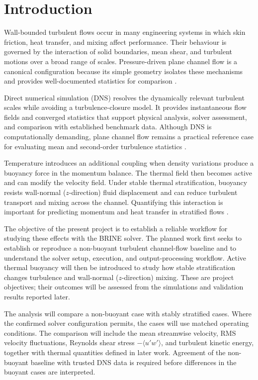 \chapter{Introduction}
\label{sec:introduction}

Wall-bounded turbulent flows occur in many engineering systems in which skin
friction, heat transfer, and mixing affect performance. Their behaviour is
governed by the interaction of solid boundaries, mean shear, and turbulent
motions over a broad range of scales. Pressure-driven plane channel flow is a
canonical configuration because its simple geometry isolates these mechanisms
and provides well-documented statistics for comparison
\cite{pope2000,kimMoinMoser1987}.

Direct numerical simulation (DNS) resolves the dynamically relevant turbulent
scales while avoiding a turbulence-closure model. It provides instantaneous
flow fields and converged statistics that support physical analysis, solver
assessment, and comparison with established benchmark data. Although DNS is
computationally demanding, plane channel flow remains a practical reference
case for evaluating mean and second-order turbulence statistics
\cite{kimMoinMoser1987}.

Temperature introduces an additional coupling when density variations produce
a buoyancy force in the momentum balance. The thermal field then becomes
active and can modify the velocity field. Under stable thermal stratification,
buoyancy resists wall-normal ($z$-direction) fluid displacement and can reduce
turbulent transport and mixing across the channel. Quantifying this interaction
is important for predicting momentum and heat transfer in stratified flows
\cite{armenioSarkar2002}.

The objective of the present project is to establish a reliable workflow for
studying these effects with the BRINE solver. The planned work first seeks to
establish or reproduce a non-buoyant turbulent channel-flow baseline and to
understand the solver setup, execution, and output-processing workflow. Active
thermal buoyancy will then be introduced to study how stable stratification
changes turbulence and wall-normal ($z$-direction) mixing. These are project
objectives; their outcomes will be assessed from the simulations and validation
results reported later.

The analysis will compare a non-buoyant case with stably stratified cases.
Where the confirmed solver configuration permits, the cases will use matched
operating conditions. The comparison will include the mean streamwise velocity,
RMS velocity fluctuations, Reynolds shear stress $-\langle u'w'\rangle$, and
turbulent kinetic energy, together with thermal quantities defined in later
work. Agreement of the non-buoyant baseline with trusted DNS data is required
before differences in the buoyant cases are interpreted.

